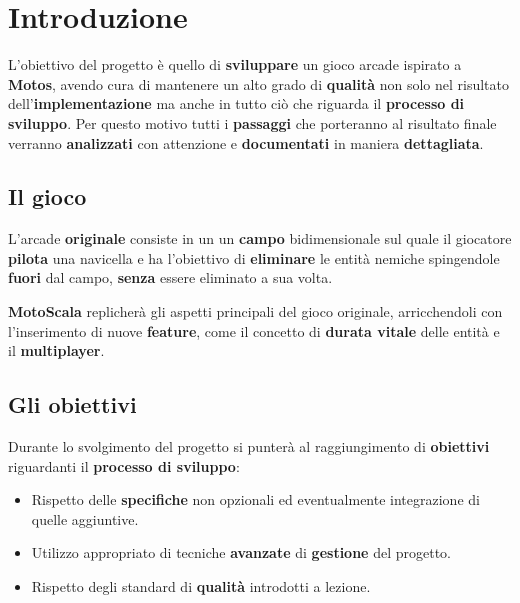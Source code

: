 \chapter{Introduzione}
L'obiettivo del progetto è quello di \textbf{sviluppare} un gioco arcade ispirato a \textbf{Motos}, avendo cura di mantenere un alto grado di \textbf{qualità} non solo nel risultato dell'\textbf{implementazione} ma anche in tutto ciò che riguarda il \textbf{processo di sviluppo}.
Per questo motivo tutti i \textbf{passaggi} che porteranno al risultato finale verranno \textbf{analizzati} con attenzione e \textbf{documentati} in maniera \textbf{dettagliata}.

\section{Il gioco} L'arcade \textbf{originale} consiste in un un \textbf{campo} bidimensionale sul quale il giocatore \textbf{pilota} una navicella e ha l'obiettivo di \textbf{eliminare} le entità nemiche spingendole \textbf{fuori} dal campo, \textbf{senza} essere eliminato a sua volta.

\textbf{MotoScala} replicherà gli aspetti principali del gioco originale, arricchendoli con l'inserimento di nuove \textbf{feature}, come il concetto di \textbf{durata vitale} delle entità e il \textbf{multiplayer}.

\section{Gli obiettivi}
Durante lo svolgimento del progetto si punterà al raggiungimento di \textbf{obiettivi} riguardanti il \textbf{processo di sviluppo}:
\begin{itemize}
    \item Rispetto delle \textbf{specifiche} non opzionali ed eventualmente integrazione di quelle aggiuntive.
    \item Utilizzo appropriato di tecniche \textbf{avanzate} di \textbf{gestione} del progetto.
    \item Rispetto degli standard di \textbf{qualità} introdotti a lezione.
\end{itemize}

